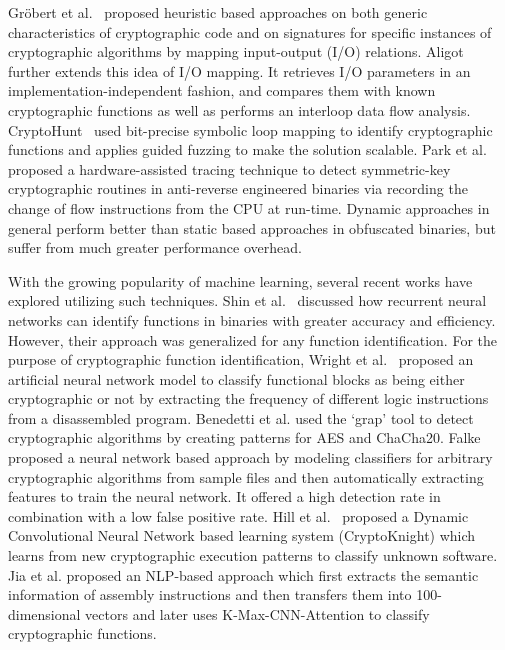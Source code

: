 Gr{\"o}bert et al.~\cite{grobert2011automated} proposed heuristic based 
approaches on both generic characteristics of cryptographic code and on
signatures for specific instances of cryptographic algorithms by mapping 
input-output (I/O) relations. Aligot~\cite{calvet2012aligot} further extends
this idea of I/O mapping. It retrieves
I/O parameters in an implementation-independent fashion, and compares
them with known cryptographic functions as well as performs
an interloop data flow analysis.
CryptoHunt~\cite{xu2017cryptographic} used bit-precise symbolic
loop mapping to identify cryptographic functions and applies guided fuzzing to
make the solution scalable. Park et al. \cite{park2020symmetric} proposed a hardware-assisted tracing technique to detect
symmetric-key cryptographic routines in anti-reverse engineered binaries via
recording the change of flow instructions from the CPU at run-time.
Dynamic approaches in general perform better than static based approaches in obfuscated
binaries, but suffer from much greater performance overhead.



 With the growing popularity of machine learning, several recent works have explored utilizing such techniques.
Shin et al.~\cite{shin2015recognizing} discussed how recurrent neural networks can identify functions in binaries with greater accuracy and efficiency.
However, their approach was generalized for any function identification. 
For the purpose of cryptographic function identification,
Wright et al.~\cite{wright2009neural} proposed an artificial neural network model to classify
functional blocks as being either cryptographic or not by extracting the frequency of different logic instructions from a
disassembled program.
Benedetti et al. \cite{benedetti2017detection} used the `grap' tool to detect
cryptographic algorithms by creating patterns for AES and ChaCha20.
Falke~\cite{aigner2018falke} proposed a neural network based approach
by modeling classifiers for arbitrary cryptographic algorithms from
sample files and then automatically extracting features to train the neural
network. It offered a high detection rate in combination with
a low false positive rate.
Hill et al.~\cite{hill2018cryptoknight} proposed a Dynamic Convolutional Neural
Network based learning system (CryptoKnight) which learns from new cryptographic
execution patterns to classify unknown software.
Jia et al. \cite{jia2020neural} proposed an NLP-based approach which first extracts the
semantic information of assembly instructions and then transfers them into
100-dimensional vectors and later uses K-Max-CNN-Attention to classify
cryptographic functions.


